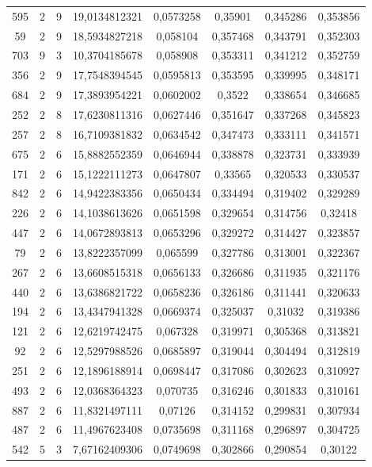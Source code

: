 \begin{longtable}{|c|c|c|c|c|c|c|c|}
595 & 2 & 9 & 19,0134812321 & 0,0573258 & 0,35901 & 0,345286 & 0,353856 \\
59 & 2 & 9 & 18,5934827218 & 0,058104 & 0,357468 & 0,343791 & 0,352303 \\
703 & 9 & 3 & 10,3704185678 & 0,058908 & 0,353311 & 0,341212 & 0,352759 \\
356 & 2 & 9 & 17,7548394545 & 0,0595813 & 0,353595 & 0,339995 & 0,348171 \\
684 & 2 & 9 & 17,3893954221 & 0,0602002 & 0,3522 & 0,338654 & 0,346685 \\
252 & 2 & 8 & 17,6230811316 & 0,0627446 & 0,351647 & 0,337268 & 0,345823 \\
257 & 2 & 8 & 16,7109381832 & 0,0634542 & 0,347473 & 0,333111 & 0,341571 \\
675 & 2 & 6 & 15,8882552359 & 0,0646944 & 0,338878 & 0,323731 & 0,333939 \\
171 & 2 & 6 & 15,1222111273 & 0,0647807 & 0,33565 & 0,320533 & 0,330537 \\
842 & 2 & 6 & 14,9422383356 & 0,0650434 & 0,334494 & 0,319402 & 0,329289 \\
226 & 2 & 6 & 14,1038613626 & 0,0651598 & 0,329654 & 0,314756 & 0,32418 \\
447 & 2 & 6 & 14,0672893813 & 0,0653296 & 0,329272 & 0,314427 & 0,323857 \\
79 & 2 & 6 & 13,8222357099 & 0,065599 & 0,327786 & 0,313001 & 0,322367 \\
267 & 2 & 6 & 13,6608515318 & 0,0656133 & 0,326686 & 0,311935 & 0,321176 \\
440 & 2 & 6 & 13,6386821722 & 0,0658236 & 0,326186 & 0,311441 & 0,320633 \\
194 & 2 & 6 & 13,4347941328 & 0,0669374 & 0,325037 & 0,31032 & 0,319386 \\
121 & 2 & 6 & 12,6219742475 & 0,067328 & 0,319971 & 0,305368 & 0,313821 \\
92 & 2 & 6 & 12,5297988526 & 0,0685897 & 0,319044 & 0,304494 & 0,312819 \\
251 & 2 & 6 & 12,1896188914 & 0,0698447 & 0,317086 & 0,302623 & 0,310927 \\
493 & 2 & 6 & 12,0368364323 & 0,070735 & 0,316246 & 0,301833 & 0,310161 \\
887 & 2 & 6 & 11,8321497111 & 0,07126 & 0,314152 & 0,299831 & 0,307934 \\
487 & 2 & 6 & 11,4967623408 & 0,0735698 & 0,311168 & 0,296897 & 0,304725 \\
542 & 5 & 3 & 7,67162409306 & 0,0749698 & 0,302866 & 0,290854 & 0,30122 \\

\end{longtable}
